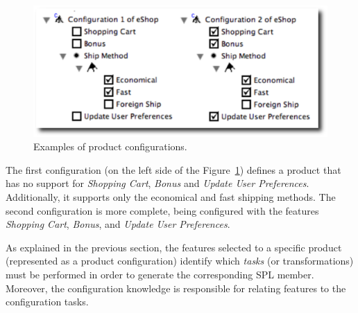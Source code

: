\documentclass{acm_proc_article-sp}
\begin{document}
 \begin{figure}[h]
 \begin{center}
  \includegraphics[scale=0.33]{img/pc-04.eps}
   \caption{Examples of product configurations.}
  \label{fig:product-config-01-02}
  \end{center}
\end{figure}

The first configuration (on the left side of the
Figure~\ref{fig:product-config-01-02}) defines a product that has no support for
\emph{Shopping Cart}, \emph{Bonus} and \emph{Update User Preferences}.
Additionally, it supports only the economical and fast shipping methods. The
second configuration is more complete, being configured with the features
\emph{Shopping Cart}, \emph{Bonus}, and \emph{Update User Preferences}.

As explained in the previous section, the features selected to a specific product (represented as a product configuration) identify which \emph{tasks} (or transformations) must be performed in order to generate the corresponding SPL member. Moreover, the configuration knowledge is responsible for relating features to the configuration tasks. 
\end{document}
